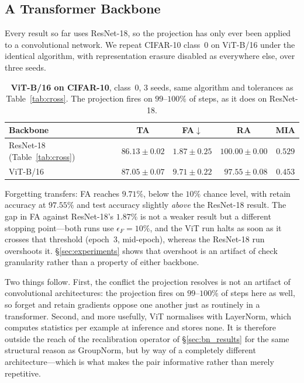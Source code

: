 \documentclass{article}
\theoremstyle{remark}
\theoremstyle{plain}
\begin{document}
\subsection{A Transformer Backbone}\label{sec:vit}

Every result so far uses ResNet-18, so the projection has only ever been applied
to a convolutional network. We repeat CIFAR-10 class~0 on ViT-B/16 under the
identical algorithm, with representation erasure disabled as everywhere else,
over three seeds.

\begin{table}[t]
\centering
\caption{\textbf{ViT-B/16 on CIFAR-10}, class~0, 3 seeds, same algorithm and
tolerances as Table~\ref{tab:cross}. The projection fires on $99$--$100\%$ of
steps, as it does on ResNet-18.}
\label{tab:vit}
\begin{tabular}{@{}lcccc@{}}
\toprule
Backbone & TA & FA$\downarrow$ & RA & MIA \\
\midrule
ResNet-18 (Table~\ref{tab:cross}) & $86.13 \pm 0.02$ & $1.87 \pm 0.25$ & $100.00 \pm 0.00$ & $0.529$ \\
ViT-B/16                          & $87.05 \pm 0.07$ & $9.71 \pm 0.22$ & $\phantom{0}97.55 \pm 0.08$ & $0.453$ \\
\bottomrule
\end{tabular}
\end{table}

Forgetting transfers: FA reaches $9.71\%$, below the $10\%$ chance level, with
retain accuracy at $97.55\%$ and test accuracy slightly \emph{above} the
ResNet-18 result. The gap in FA against ResNet-18's $1.87\%$ is not a weaker
result but a different stopping point---both runs use $\epsilon_F = 10\%$, and
the ViT run halts as soon as it crosses that threshold (epoch~3, mid-epoch),
whereas the ResNet-18 run overshoots it. \S\ref{sec:experiments} shows that
overshoot is an artifact of check granularity rather than a property of either
backbone.

Two things follow. First, the conflict the projection resolves is not an artifact
of convolutional architectures: the projection fires on $99$--$100\%$ of steps
here as well, so forget and retain gradients oppose one another just as
routinely in a transformer. Second, and more usefully,
ViT normalises with LayerNorm, which computes statistics per example at
inference and stores none. It is therefore outside the reach of the
recalibration operator of \S\ref{sec:bn_results} for the same structural reason
as GroupNorm, but by way of a completely different architecture---which is what
makes the pair informative rather than merely repetitive.
\end{document}

